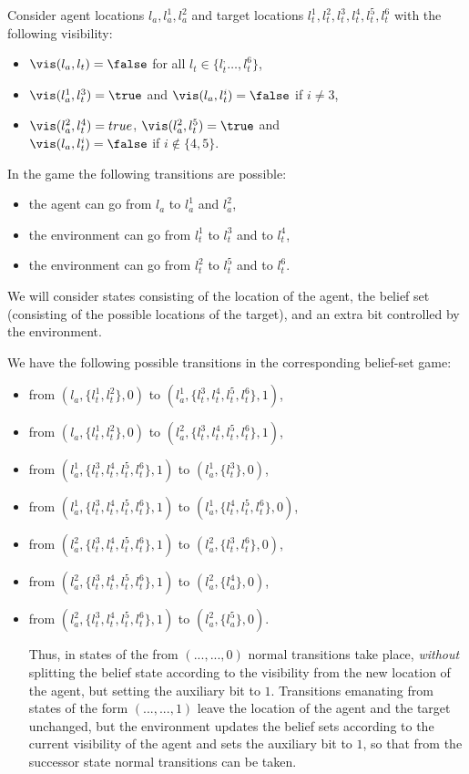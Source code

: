 \begin{example}
Consider agent locations $l_a,l_a^1,l_a^2$ and target locations 
$l_t^1,l_t^2,l_t^3,l_t^4,l_t^5,l_t^6$ with the following visibility:
\begin{itemize}
\item $\vis(l_a,l_t) =\false$ for all $l_t \in \{l_t^,\ldots,l_t^6\}$,
\item $\vis(l_a^1,l_t^3) =\true$ and $\vis(l_a,l_t^i) =\false$ if $i \neq 3$,
\item $\vis(l_a^2,l_t^4) =true$, $\vis(l_a^2,l_t^5) =\true$ and\\ $\vis(l_a,l_t^i) =\false$ if $i \not \in \{4,5\}$.
\end{itemize}
In the game the following transitions are possible:
\begin{itemize}
\item the agent can go from $l_a$ to $l_a^1$ and $l_a^2$,
\item the environment can go from $l_t^1$ to $l_t^3$ and to $l_t^4$,
\item the environment can go from $l_t^2$ to $l_t^5$ and to $l_t^6$.
\end{itemize}


We will consider states consisting of the location of the agent, the belief set (consisting of the possible locations of the target), and an extra bit controlled by the environment.

We have the following  possible transitions in the corresponding belief-set game:
\begin{itemize}
\item from $(l_a,\{l_t^1,l_t^2\},0)$ to $(l_a^1,\{l_t^3,l_t^4,l_t^5,l_t^6\},1)$,
\item from $(l_a,\{l_t^1,l_t^2\},0)$ to $(l_a^2,\{l_t^3,l_t^4,l_t^5,l_t^6\},1)$,
\item from $(l_a^1,\{l_t^3,l_t^4,l_t^5,l_t^6\},1)$ to $(l_a^1,\{l_t^3\},0)$,
\item from $(l_a^1,\{l_t^3,l_t^4,l_t^5,l_t^6\},1)$ to $(l_a^1,\{l_t^4,l_t^5,l_t^6\},0)$,
\item from $(l_a^2,\{l_t^3,l_t^4,l_t^5,l_t^6\},1)$ to $(l_a^2,\{l_t^3,l_t^6\},0)$,
\item from $(l_a^2,\{l_t^3,l_t^4,l_t^5,l_t^6\},1)$ to $(l_a^2,\{l_a^4\},0)$,
\item from $(l_a^2,\{l_t^3,l_t^4,l_t^5,l_t^6\},1)$ to $(l_a^2,\{l_a^5\},0)$.

Thus, in states of the from $(...,...,0)$ normal transitions take place, \emph{without} splitting the belief state according to the visibility from the new location of the agent, but setting the auxiliary bit to $1$. Transitions emanating from states of the form $(...,...,1)$ leave the location of the agent and the target unchanged, but the environment updates the belief sets according to the current visibility of the agent and sets the auxiliary bit to $1$, so that from the successor state normal transitions can be taken.




\end{itemize}

\end{example}
